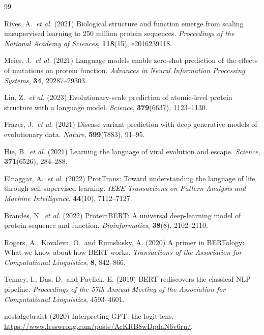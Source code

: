 \documentclass[11pt,a4paper]{article}
\newcommand{\revised}[1]{#1}
\begin{document}
\newpage
\begin{thebibliography}{99}


Rives, A.\ \textit{et al.} (2021)
Biological structure and function emerge from scaling unsupervised learning to 250
million protein sequences.
\textit{Proceedings of the National Academy of Sciences}, \textbf{118}(15), e2016239118.

Meier, J.\ \textit{et al.} (2021)
Language models enable zero-shot prediction of the effects of mutations on protein
function.
\textit{Advances in Neural Information Processing Systems}, \textbf{34}, 29287--29303.

Lin, Z.\ \textit{et al.} (2023)
Evolutionary-scale prediction of atomic-level protein structure with a language model.
\textit{Science}, \textbf{379}(6637), 1123--1130.

Frazer, J.\ \textit{et al.} (2021)
Disease variant prediction with deep generative models of evolutionary data.
\textit{Nature}, \textbf{599}(7883), 91--95.

Hie, B.\ \textit{et al.} (2021)
Learning the language of viral evolution and escape.
\textit{Science}, \textbf{371}(6526), 284--288.

Elnaggar, A.\ \textit{et al.} (2022)
ProtTrans: Toward understanding the language of life through self-supervised learning.
\textit{IEEE Transactions on Pattern Analysis and Machine Intelligence}, \textbf{44}(10),
7112--7127.

Brandes, N.\ \textit{et al.} (2022)
ProteinBERT: A universal deep-learning model of protein sequence and function.
\textit{Bioinformatics}, \textbf{38}(8), 2102--2110.

Rogers, A., Kovaleva, O.\ and Rumshisky, A. (\revised{2020})
A primer in BERTology: What we know about how BERT works.
\textit{Transactions of the Association for Computational Linguistics}, \textbf{8},
842--866.

Tenney, I., Das, D.\ and Pavlick, E. (2019)
BERT rediscovers the classical NLP pipeline.
\textit{Proceedings of the 57th Annual Meeting of the Association for Computational
Linguistics}, 4593--4601.

nostalgebraist (2020)
Interpreting GPT: the logit lens.
\url{https://www.lesswrong.com/posts/AcKRB8wDpdaN6v6ru/}.


\end{thebibliography}
\end{document}
